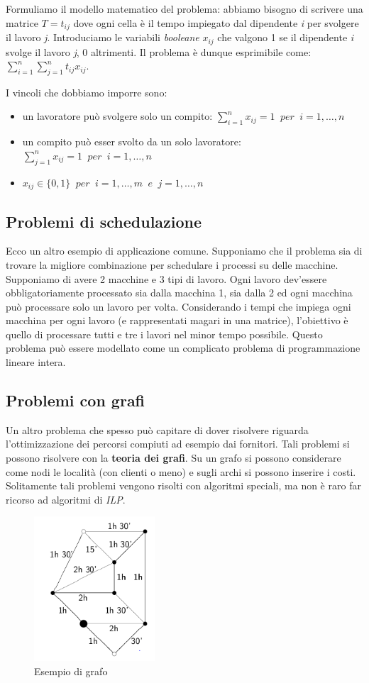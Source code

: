 \documentclass[11pt]{book}
\begin{document}
Formuliamo il modello matematico del problema: abbiamo bisogno di
scrivere una matrice $T=t_{ij}$ dove ogni cella \`e il tempo impiegato
dal dipendente {\em i} per svolgere il lavoro {\em j}. Introduciamo le
variabili {\em booleane} $x_{ij}$ che valgono 1 se il dipendente {\em
  i} svolge il lavoro {\em j}, 0 altrimenti. Il problema \`e dunque
esprimibile come: $\sum_{i=1}^{n}\sum_{j=1}^{n}t_{ij}x_{ij}$.

I vincoli che dobbiamo imporre sono:

\begin{itemize}
\item un lavoratore pu\`o svolgere solo un compito:
  $\sum_{i=1}^{n}x_{ij} = 1\phantom{a}per\phantom{a}i=1,\dots ,n$
\item un compito pu\`o esser svolto da un solo lavoratore:
  $\sum_{j=1}^{n}x_{ij} = 1\phantom{a}per\phantom{a}i=1,\dots ,n$
\item $x_{ij} \in
  \{0,1\}\phantom{a}per\phantom{a}i=1,\dots,m\phantom{a}e\phantom{a}j=1,\dots,n$
\end{itemize}


\subsection{Problemi di schedulazione}

Ecco un altro esempio di applicazione comune. Supponiamo che il
problema sia di trovare la migliore combinazione per schedulare i
processi su delle macchine. Supponiamo di avere 2 macchine e 3 tipi di
lavoro. Ogni lavoro dev'essere obbligatoriamente processato sia dalla
macchina 1, sia dalla 2 ed ogni macchina pu\`o processare solo un
lavoro per volta. Considerando i tempi che impiega ogni macchina per
ogni lavoro (e rappresentati magari in una matrice), l'obiettivo \`e
quello di processare tutti e tre i lavori nel minor tempo
possibile. Questo problema pu\`o essere modellato come un complicato
problema di programmazione lineare intera.

\subsection{Problemi con grafi}

Un altro problema che spesso pu\`o capitare di dover risolvere
riguarda l'ottimizzazione dei percorsi compiuti ad esempio dai
fornitori. Tali problemi si possono risolvere con la {\bf teoria dei
  grafi}. Su un grafo si possono considerare come nodi le localit\`a
(con clienti o meno) e sugli archi si possono inserire i
costi. Solitamente tali problemi vengono risolti con algoritmi
speciali, ma non \`e raro far ricorso ad algoritmi di {\em ILP}.

\begin{figure}[h!]
  \centering
  \includegraphics[width=0.4\textwidth]{images/grafo.png}
  \caption{Esempio di grafo}
\end{figure}
\end{document}
